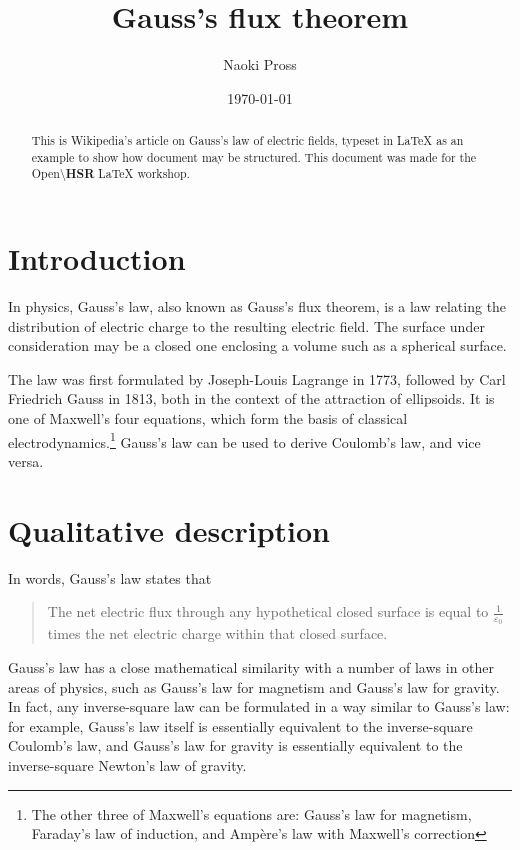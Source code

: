 \documentclass[a4paper]{article}
\title{Gauss's flux theorem}
\author{Naoki Pross}
\date{\today}
\begin{document}
\maketitle

\begin{abstract}
This is Wikipedia's article on Gauss's law \cite{wiki} of electric fields, typeset in \LaTeX{} as an example to show how document may be structured. This document was made for the \textsf{Open\textcolor{cyan!50!blue}{\textbackslash{\textbf{HSR}}}} \LaTeX{} workshop.
\end{abstract}
\tableofcontents
\newpage

\section{Introduction}
In physics, Gauss's law, also known as Gauss's flux theorem, is a law relating the distribution of electric charge to the resulting electric field. The surface under consideration may be a closed one enclosing a volume such as a spherical surface.

The law was first formulated by Joseph-Louis Lagrange in 1773, followed by Carl Friedrich Gauss in 1813, both in the context of the attraction of ellipsoids. It is one of Maxwell's four equations, which form the basis of classical electrodynamics.\footnote{The other three of Maxwell's equations are: Gauss's law for magnetism, Faraday's law of induction, and Ampère's law with Maxwell's correction} Gauss's law can be used to derive Coulomb's law, and vice versa. 

\section{Qualitative description}
In words, Gauss's law states that

\begin{quote}
The net electric flux through any hypothetical closed surface is equal to \(\frac{1}{\varepsilon_0}\) times the net electric charge within that closed surface.
\end{quote}

Gauss's law has a close mathematical similarity with a number of laws in other areas of physics, such as Gauss's law for magnetism and Gauss's law for gravity. In fact, any inverse-square law can be formulated in a way similar to Gauss's law: for example, Gauss's law itself is essentially equivalent to the inverse-square Coulomb's law, and Gauss's law for gravity is essentially equivalent to the inverse-square Newton's law of gravity.
\end{document}
